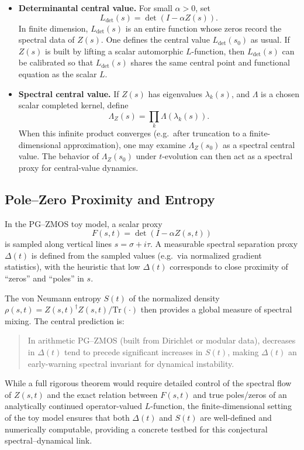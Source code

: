 \documentclass[11pt]{article}
\begin{document}
\begin{itemize}
  \item \textbf{Determinantal central value.} For small $\alpha>0$, set
  \[
    L_{\det}(s) = \det(I - \alpha Z(s)).
  \]
  In finite dimension, $L_{\det}(s)$ is an entire function whose zeros
  record the spectral data of $Z(s)$. One defines the central value
  $L_{\det}(s_0)$ as usual. If $Z(s)$ is built by lifting a scalar
  automorphic $L$-function, then $L_{\det}(s)$ can be calibrated so
  that $L_{\det}(s)$ shares the same central point and functional
  equation as the scalar $L$.

  \item \textbf{Spectral central value.} If $Z(s)$ has eigenvalues
  $\lambda_k(s)$, and $\Lambda$ is a chosen scalar completed kernel,
  define
  \[
    \Lambda_Z(s) = \prod_k \Lambda(\lambda_k(s)).
  \]
  When this infinite product converges (e.g.\ after truncation to a
  finite-dimensional approximation), one may examine $\Lambda_Z(s_0)$
  as a spectral central value. The behavior of $\Lambda_Z(s_0)$ under
  $t$-evolution can then act as a spectral proxy for central-value
  dynamics.
\end{itemize}

\subsection{Pole–Zero Proximity and Entropy}

In the PG–ZMOS toy model, a scalar proxy
\[
  F(s,t) = \det(I - \alpha Z(s,t))
\]
is sampled along vertical lines $s = \sigma + i\tau$. A measurable
spectral separation proxy $\Delta(t)$ is defined from the sampled values
(e.g.\ via normalized gradient statistics), with the heuristic that
low $\Delta(t)$ corresponds to close proximity of ``zeros'' and
``poles'' in $s$.

The von Neumann entropy $S(t)$ of the normalized density
$\rho(s,t) = Z(s,t)^\dagger Z(s,t)/\mathrm{Tr}(\cdot)$ then provides a
global measure of spectral mixing. The central prediction is:

\begin{quote}
In arithmetic PG–ZMOS (built from Dirichlet or modular data), decreases
in $\Delta(t)$ tend to precede significant increases in $S(t)$, making
$\Delta(t)$ an early-warning spectral invariant for dynamical
instability.
\end{quote}

While a full rigorous theorem would require detailed control of the
spectral flow of $Z(s,t)$ and the exact relation between $F(s,t)$ and
true poles/zeros of an analytically continued operator-valued
$L$-function, the finite-dimensional setting of the toy model ensures
that both $\Delta(t)$ and $S(t)$ are well-defined and numerically
computable, providing a concrete testbed for this conjectural
spectral–dynamical link.
\end{document}
